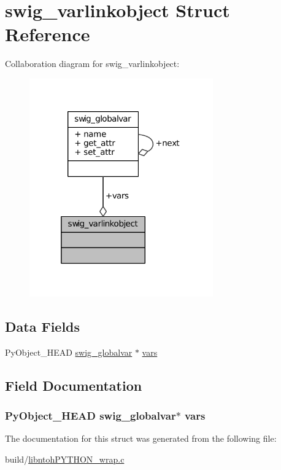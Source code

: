 \hypertarget{structswig__varlinkobject}{\section{swig\-\_\-varlinkobject Struct Reference}
\label{structswig__varlinkobject}
}


Collaboration diagram for swig\-\_\-varlinkobject\-:
\nopagebreak
\begin{figure}[H]
\begin{center}
\leavevmode
\includegraphics[width=224pt]{structswig__varlinkobject__coll__graph}
\end{center}
\end{figure}
\subsection*{Data Fields}
\begin{DoxyCompactItemize}
\item 
Py\-Object\-\_\-\-H\-E\-A\-D \hyperlink{structswig__globalvar}{swig\-\_\-globalvar} $\ast$ \hyperlink{structswig__varlinkobject_a64a30a7c2383b2e2a7bd8aeb3e492449}{vars}
\end{DoxyCompactItemize}


\subsection{Field Documentation}
\hypertarget{structswig__varlinkobject_a64a30a7c2383b2e2a7bd8aeb3e492449}{
\subsubsection[{vars}]{\setlength{\rightskip}{0pt plus 5cm}Py\-Object\-\_\-\-H\-E\-A\-D {\bf swig\-\_\-globalvar}$\ast$ vars}}\label{structswig__varlinkobject_a64a30a7c2383b2e2a7bd8aeb3e492449}


The documentation for this struct was generated from the following file\-:\begin{DoxyCompactItemize}
\item 
build/\hyperlink{libntoh_p_y_t_h_o_n__wrap_8c}{libntoh\-P\-Y\-T\-H\-O\-N\-\_\-wrap.\-c}\end{DoxyCompactItemize}
